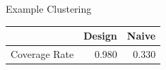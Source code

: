 \documentclass{beamer}\usepackage[]{graphicx}\usepackage[]{color}
\begin{document}
\begin{frame}[fragile]{Example Clustering}
{%
\begin{table}[ht]
\centering
\begin{tabular}{rrr}
  \hline
 & Design & Naive \\ 
  \hline
Coverage Rate & 0.980 & 0.330 \\ 
   \hline
\end{tabular}
\end{table}

}

\end{frame}



\end{document}
